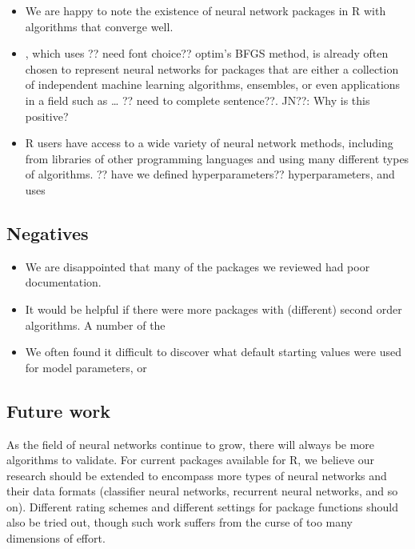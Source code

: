 \begin{itemize}
\tightlist
\item
  We are happy to note the existence of neural network packages in R
  with algorithms that converge well.
\item
  , which uses ?? need font choice?? optim's BFGS method, is
  already often chosen to represent neural networks for packages that
  are either a collection of independent machine learning algorithms,
  ensembles, or even applications in a field such as \ldots{} ?? need to
  complete sentence??. JN??: Why is this positive?
\item
  R users have access to a wide variety of neural network methods,
  including from libraries of other programming languages and using many
  different types of algorithms. ?? have we defined hyperparameters??
  hyperparameters, and uses 
\end{itemize}

\hypertarget{negatives}{%
\subsection{Negatives}\label{negatives}}

\begin{itemize}
\tightlist
\item
  We are disappointed that many of the packages we reviewed had poor
  documentation.
\item
  It would be helpful if there were more packages with (different)
  second order algorithms. A number of the 
\item
  We often found it difficult to discover what default starting values
  were used for model parameters, or 
\end{itemize}

\hypertarget{future-work}{%
\subsection{Future work}\label{future-work}}

As the field of neural networks continue to grow, there will always be
more algorithms to validate. For current packages available for R, we
believe our research should be extended to encompass more types of
neural networks and their data formats (classifier neural networks,
recurrent neural networks, and so on). Different rating schemes and
different settings for package functions should also be tried out,
though such work suffers from the curse of too many dimensions of
effort.

